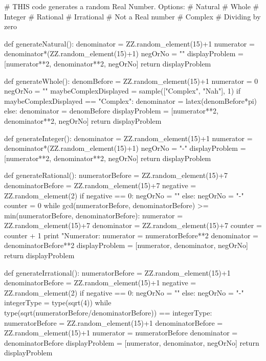 \documentclass{ximera}
\begin{document}
\begin{sagesilent}
# THIS code generates a random Real Number. Options:
# Natural
# Whole
# Integer
# Rational
# Irrational
# Not a Real number
# Complex
# Dividing by zero

def generateNatural():
    denominator = ZZ.random_element(15)+1
    numerator = denominator*(ZZ.random_element(15)+1)
    negOrNo = ""
    displayProblem = [numerator**2, denominator**2, negOrNo]
    return displayProblem

def generateWhole():
    denomBefore = ZZ.random_element(15)+1
    numerator = 0
    negOrNo = ""
    maybeComplexDisplayed = sample(["Complex", "Nah"], 1)
    if maybeComplexDisplayed == "Complex":
        denominator = latex(denomBefore*pi)
    else:
        denominator = denomBefore
    displayProblem = [numerator**2, denominator**2, negOrNo]
    return displayProblem

def generateInteger():
    denominator = ZZ.random_element(15)+1
    numerator = denominator*(ZZ.random_element(15)+1)
    negOrNo = "-"
    displayProblem = [numerator**2, denominator**2, negOrNo]
    return displayProblem

def generateRational():
    numeratorBefore = ZZ.random_element(15)+7
    denominatorBefore = ZZ.random_element(15)+7
    negative = ZZ.random_element(2)
    if negative == 0:
        negOrNo = ""
    else:
        negOrNo = "-"
    counter = 0
    while gcd(numeratorBefore, denominatorBefore) >= min(numeratorBefore, denominatorBefore):
        numerator = ZZ.random_element(15)+7
        denominator = ZZ.random_element(15)+7
        counter = counter + 1
        print "Numerator: %
    numerator = numeratorBefore**2
    denominator = denominatorBefore**2
    displayProblem = [numerator, denominator, negOrNo]
    return displayProblem

def generateIrrational():
    numeratorBefore = ZZ.random_element(15)+1
    denominatorBefore = ZZ.random_element(15)+1
    negative = ZZ.random_element(2)
    if negative == 0:
        negOrNo = ""
    else:
        negOrNo = "-"
    integerType = type(sqrt(4))
    while type(sqrt(numeratorBefore/denominatorBefore)) == integerType:
        numeratorBefore = ZZ.random_element(15)+1
        denominatorBefore = ZZ.random_element(15)+1
    numerator = numeratorBefore
    denominator = denominatorBefore
    displayProblem = [numerator, denominator, negOrNo]
    return displayProblem


\end{sagesilent}
\end{document}
